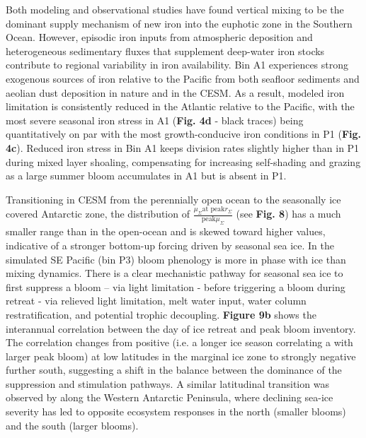 Both modeling \parencite{Misumiironbudgetocean2014} and observational \parencite{TagliabueSurfacewaterironsupplies2014} studies have found vertical mixing to be the dominant supply mechanism of new iron into the euphotic zone in the Southern Ocean. However, episodic iron inputs from atmospheric deposition \parencite{GaieroIronothertransition2003} and heterogeneous sedimentary fluxes that supplement deep-water iron stocks \parencite{MooreSedimentarymineraldust2008,TagliabueEvaluatingimportanceatmospheric2009} contribute to regional variability in iron availability. Bin A1 experiences strong exogenous sources of iron relative to the Pacific from both seafloor sediments and aeolian dust deposition in nature \parencite{GaieroIronothertransition2003, MooreSedimentarymineraldust2008, TagliabueEvaluatingimportanceatmospheric2009} and in the CESM. As a result, modeled iron limitation is consistently reduced in the Atlantic relative to the Pacific, with the most severe seasonal iron stress in A1 (\textbf{Fig. 4d} - black traces) being quantitatively on par with the most growth-conducive iron conditions in P1 (\textbf{Fig. 4c}). Reduced iron stress in Bin A1 keeps division rates slightly higher than in P1 during mixed layer shoaling, compensating for increasing self-shading and grazing as a large summer bloom accumulates in A1 but is absent in P1. 

Transitioning in CESM from the perennially open ocean to the seasonally ice covered Antarctic zone, the distribution of $\frac{\mu_\Sigma \textrm{at peak} r_\Sigma}{\textrm{peak} \mu_\Sigma}$ (see \textbf{Fig. 8}) has a much smaller range than in the open-ocean and is skewed toward higher values, indicative of a stronger bottom-up forcing driven by seasonal sea ice. In the simulated SE Pacific (bin P3) bloom phenology is more in phase with ice than mixing dynamics. There is a clear mechanistic pathway for seasonal sea ice to first suppress a bloom – via light limitation - before triggering a bloom during retreat - via relieved light limitation, melt water input, water column restratification, and potential trophic decoupling. \textbf{Figure 9b} shows the interannual correlation between the day of ice retreat and peak bloom inventory. The correlation changes from positive (i.e. a longer ice season correlating a with larger peak bloom) at low latitudes in the marginal ice zone to strongly negative further south, suggesting a shift in the balance between the dominance of the suppression and stimulation pathways. A similar latitudinal transition was observed by \textcite{Montes-HugoRecentchangesphytoplankton2009} along the Western Antarctic Peninsula, where declining sea-ice severity has led to opposite ecosystem responses in the north (smaller blooms) and the south (larger blooms).  

